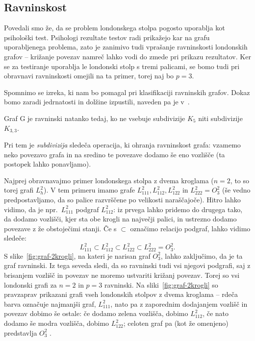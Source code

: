 \documentclass[twoside,11pt]{article}
\begin{document}
\subsection{Ravninskost}

Povedali smo že, da se problem londonskega stolpa pogosto uporablja kot psihološki test. Psihologi rezultate testov radi prikažejo kar na grafu uporabljenega problema, zato je zanimivo tudi vprašanje ravninskosti londonskih grafov -- križanje povezav namreč lahko vodi do zmede pri prikazu rezultatov. Ker se za testiranje uporablja le londonski stolp s tremi palicami, se bomo tudi pri obravnavi ravninskosti omejili na ta primer, torej naj bo $p=3$.

Spomnimo se izreka, ki nam bo pomagal pri klasifikaciji ravninskih grafov. Dokaz bomo zaradi jedrnatosti in dolžine izpustili, naveden pa je v~\cite[str.~247-251]{bib:west}.

\begin{izrek}[Kuratowski]
    \label{izr:kuratowski}
    Graf G je ravninski natanko tedaj, ko ne vsebuje subdivizije $K_5$ niti subdivizije $K_{3,3}$.
\end{izrek}

Pri tem je \emph{subdivizija} sledeča operacija, ki ohranja ravninskost grafa: vzamemo neko povezavo grafa in na sredino te povezave dodamo še eno vozlišče (ta postopek lahko ponavljamo). \cite[str.~66]{bib:potocnik}

Najprej obravnavajmo primer londonskega stolpa z dvema kroglama ($n=2$, to so torej grafi $L^2_h$). V tem primeru imamo grafe 
$L^2_{111}, L^2_{112}, L^2_{122}$ in $L^2_{222} = O^2_3$ (še vedno predpostavljamo, da so palice razvrščene po velikosti naraščajoče). Hitro lahko vidimo, da je npr.\ $L^2_{111}$ podgraf $L^2_{112}$: iz prvega lahko pridemo do drugega tako, da dodamo vozlišči, kjer sta obe krogli na največji palici, in ustrezno dodamo povezave z že obstoječimi stanji. Če s $ \subset $ označimo relacijo podgraf, lahko vidimo sledeče:
\[ L^2_{111} \subset L^2_{112} \subset L^2_{122} \subset L^2_{222} = O^2_3 .\]
S slike~\ref{fig:graf-2krogli}, na kateri je narisan graf $O^2_3$, lahko zaključimo, da je ta graf ravninski. Iz tega seveda sledi, da so ravninski tudi vsi njegovi podgrafi, saj z brisanjem vozlišč in povezav ne moremo ustvariti križanj povezav. Torej so vsi londonski grafi za $n=2$ in $p=3$ ravninski.
Na sliki~\ref{fig:graf-2krogli} so pravzaprav prikazani grafi vseh londonskih stolpov z dvema kroglama -- rdeča barva označuje najmanjši graf, $L^2_{111}$, nato pa z zaporednim dodajanjem vozlišč in povezav dobimo še ostale: če dodamo zelena vozlišča, dobimo $L^2_{112}$, če nato dodamo še modra vozlišča, dobimo $L^2_{122}$; celoten graf pa (kot že omenjeno) predstavlja $O^2_3$ .
\end{document}
